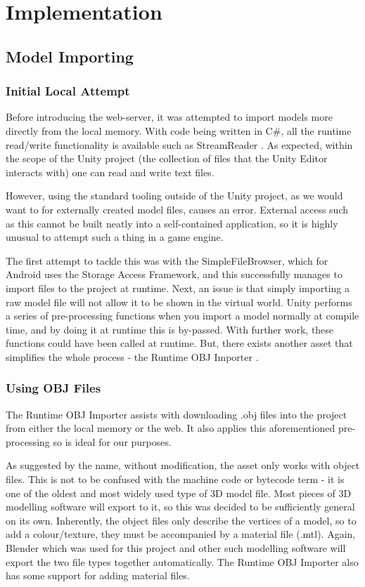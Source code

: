 \documentclass{article}
\begin{document}
\section{Implementation}

\subsection{Model Importing}
\label{modelimporting}

\subsubsection{Initial Local Attempt}
\label{initiallocalattempt}
Before introducing the web-server, it was attempted to import models more directly from the local memory. With code being written in C\#, all the runtime read/write functionality is available such as StreamReader \cite{models:streamreader}. As expected, within the scope of the Unity project (the collection of files that the Unity Editor interacts with) one can read and write text files.

However, using the standard tooling outside of the Unity project, as we would want to for externally created model files, causes an error. External access such as this cannot be built neatly into a self-contained application, so it is highly unusual to attempt such a thing in a game engine. 

The first attempt to tackle this was with the SimpleFileBrowser, which for Android uses the Storage Access Framework, and this successfully manages to import files to the project at runtime. Next, an issue is that simply importing a raw model file will not allow it to be shown in the virtual world. Unity performs a series of pre-processing functions when you import a model normally at compile time, and by doing it at runtime this is by-passed. With further work, these functions could have been called at runtime. But, there exists another asset that simplifies the whole process - the Runtime OBJ Importer \cite{models:objimporter}.

\subsubsection{Using OBJ Files}
The Runtime OBJ Importer assists with downloading .obj files into the project from either the local memory or the web. It also applies this aforementioned pre-processing so is ideal for our purposes. 

As suggested by the name, without modification, the asset only works with object files. This is not to be confused with the machine code or bytecode term - it is one of the oldest and most widely used type of 3D model file. Most pieces of 3D modelling software will export to it, so this was decided to be sufficiently general on its own. Inherently, the object files only describe the vertices of a model, so to add a colour/texture, they must be accompanied by a material file (.mtl). Again, Blender which was used for this project and other such modelling software will export the two file types together automatically. The Runtime OBJ Importer also has some support for adding material files.
\end{document}
